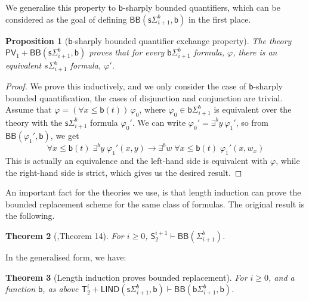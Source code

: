 \documentclass[11pt]{article}
\newcommand{\PV}{\mathsf{PV}}
\newcommand{\bd}{\mathsf{b}}
\newtheorem{theorem}{Theorem}[section]
\newtheorem{proposition}[theorem]{Proposition}
\theoremstyle{definition}
\theoremstyle{definition}
\theoremstyle{remark}
\begin{document}
We generalise this property to $\bd$-sharply bounded quantifiers, which can be considered as the goal of defining $\mathsf{BB}(\mathsf{s}\Sigma^b_{i+1},\bd)$ in the first place.

\begin{proposition}[$\bd$-sharply bounded quantifier exchange property]\label{prop:bd-exchange}
    The theory $\PV_1+\mathsf{BB}(\mathsf{s}\Sigma^b_{i+1},\bd)$ proves that for every $\bd\Sigma^b_{i+1}$ formula, $\varphi$, there is an equivalent $s\Sigma^b_{i+1}$ formula, $\varphi'$.
\end{proposition}

\begin{proof}
    We prove this inductively, and we only consider the case of $\bd$-sharply bounded quantification, the cases of disjunction and conjunction are trivial. Assume that $\varphi = (\forall x\leq \bd(t))\, \varphi_0$, where $\varphi_0\in \bd\Sigma^b_{i+1}$ is equivalent over the theory with the $\mathsf{s}\Sigma^b_{i+1}$ formula $\varphi_0'$. We can write $\varphi_0'=\exists^by \:\varphi_1'$, so from $\mathsf{BB}(\varphi_1',\bd)$, we get
    $$
    \forall x\leq \bd(t) \;\exists^b y\;\varphi_1'(x,y) \rightarrow \exists^b w\;\forall x\leq \bd(t)\;\varphi_1'(x,w_x)
    $$
    This is actually an equivalence and the left-hand side is equivalent with $\varphi$, while the right-hand side is strict, which gives us the desired result.
\end{proof}

An important fact for the theories we use, is that length induction can prove the bounded replacement scheme for the same class of formulas. The original result is the following.

\begin{theorem}[\cite{buss1985bounded},Theorem 14]\label{theoremsotprovesbb1}
    For $i\geq 0$, $\mathsf{S}^{i+1}_2 \vdash \mathsf{BB}(\Sigma^b_{i+1})$.
\end{theorem}

In the generalised form, we have:

\begin{theorem}[Length induction proves bounded replacement]\label{theoremllindprovesbb}
    For $i\geq 0$, and a function $\bd$, as above $\mathsf{T}^{i}_2 + \mathsf{LIND}(\mathsf{s}\Sigma^b_{i+1},\bd) \vdash \mathsf{BB}(\bd\Sigma^b_{i+1},\bd)$.
\end{theorem}
\end{document}
